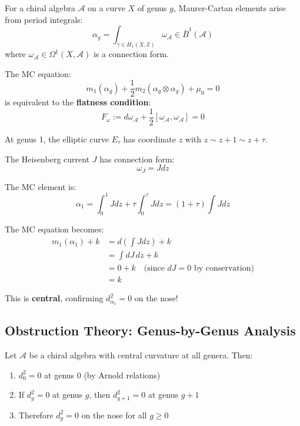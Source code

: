 \begin{theorem}\label{thm:mc-periods}
For a chiral algebra $\mathcal{A}$ on a curve $X$ of genus $g$, Maurer-Cartan elements arise 
from period integrals:
\begin{equation}
\alpha_g = \int_{\gamma \in H_1(X, \mathbb{Z})} \omega_{\mathcal{A}} \in \bar{B}^1(\mathcal{A})
\end{equation}
where $\omega_{\mathcal{A}} \in \Omega^1(X, \mathcal{A})$ is a connection form.

The MC equation:
\begin{equation}
m_1(\alpha_g) + \frac{1}{2}m_2(\alpha_g \otimes \alpha_g) + \mu_0 = 0
\end{equation}
is equivalent to the \textbf{flatness condition}:
\begin{equation}
F_{\omega} := d\omega_{\mathcal{A}} + \frac{1}{2}[\omega_{\mathcal{A}}, \omega_{\mathcal{A}}] = 0
\end{equation}
\end{theorem}

\begin{example}
At genus 1, the elliptic curve $E_\tau$ has coordinate $z$ with $z \sim z + 1 \sim z + \tau$.

The Heisenberg current $J$ has connection form:
$$\omega_J = J dz$$

The MC element is:
$$\alpha_1 = \int_0^1 J dz + \tau \int_0^\tau J dz = (1 + \tau) \int J dz$$

The MC equation becomes:
\begin{align}
m_1(\alpha_1) + k &= d\left(\int J dz\right) + k \\
&= \int dJ \, dz + k \\
&= 0 + k \quad \text{(since $dJ = 0$ by conservation)} \\
&= k
\end{align}

This is \textbf{central}, confirming $d_{\alpha_1}^2 = 0$ on the nose!
\end{example}

\subsection{Obstruction Theory: Genus-by-Genus Analysis}

\begin{theorem}\label{thm:genus-induction-strict}
Let $\mathcal{A}$ be a chiral algebra with central curvature at all genera. Then:
\begin{enumerate}
\item $d_0^2 = 0$ at genus 0 (by Arnold relations)
\item If $d_g^2 = 0$ at genus $g$, then $d_{g+1}^2 = 0$ at genus $g+1$
\item Therefore $d_g^2 = 0$ on the nose for all $g \geq 0$
\end{enumerate}
\end{theorem}

